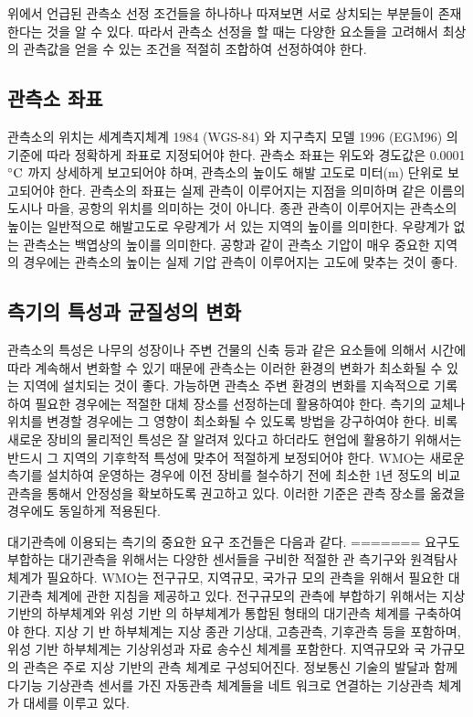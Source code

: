 \begin{itemize}
위에서 언급된 관측소 선정 조건들을 하나하나 따져보면 서로 상치되는 부분들이 존재한다는 것을 알 수 있다. 따라서 관측소 선정을 할 때는 다양한 요소들을 고려해서 최상의 관측값을 얻을 수 있는 조건을 적절히 조합하여 선정하여야 한다.

\subsection{관측소 좌표}
관측소의 위치는 세계측지체계 1984 (WGS-84) 와 지구측지 모델 1996 (EGM96) 의 기준에 따라 정확하게 좌표로 지정되어야 한다. 관측소 좌표는 위도와 경도값은 0.0001 $\rm ^{\circ}C$ 까지 상세하게 보고되어야 하며, 관측소의 높이도 해발 고도로 미터(m) 단위로 보고되어야 한다. 관측소의 좌표는 실제 관측이 이루어지는 지점을 의미하며 같은 이름의 도시나 마을, 공항의 위치를 의미하는 것이 아니다. 종관 관측이 이루어지는 관측소의 높이는 일반적으로 해발고도로 우량계가 서 있는 지역의 높이를 의미한다. 우량계가 없는 관측소는 백엽상의 높이를 의미한다. 공항과 같이 관측소 기압이 매우 중요한 지역의 경우에는 관측소의 높이는 실제 기압 관측이 이루어지는 고도에 맞추는 것이 좋다.

\subsection{측기의 특성과 균질성의 변화}
관측소의 특성은 나무의 성장이나 주변 건물의 신축 등과 같은 요소들에 의해서 시간에 따라 계속해서 변화할 수 있기 때문에 관측소는 이러한 환경의 변화가 최소화될 수 있는 지역에 설치되는 것이 좋다. 가능하면 관측소 주변 환경의 변화를 지속적으로 기록하여 필요한 경우에는 적절한 대체 장소를 선정하는데 활용하여야 한다. 측기의 교체나 위치를 변경할 경우에는 그 영향이 최소화될 수 있도록 방법을 강구하여야 한다. 비록 새로운 장비의 물리적인 특성은 잘 알려져 있다고 하더라도 현업에 활용하기 위해서는 반드시 그 지역의 기후학적 특성에 맞추어 적절하게 보정되어야 한다.
WMO는 새로운 측기를 설치하여 운영하는 경우에 이전 장비를 철수하기 전에 최소한 1년 정도의 비교 관측을 통해서 안정성을 확보하도록 권고하고 있다. 이러한 기준은 관측 장소를 옮겼을 경우에도 동일하게 적용된다.

대기관측에 이용되는 측기의 중요한 요구 조건들은 다음과 같다.
=======
요구도 부합하는 대기관측을 위해서는 다양한 센서들을 구비한 적절한 관
측기구와 원격탐사 체계가 필요하다. WMO는 전구규모, 지역규모, 국가규
모의 관측을 위해서 필요한 대기관측 체계에 관한 지침을 제공하고 있다.
전구규모의 관측에 부합하기 위해서는 지상 기반의 하부체계와 위성 기반
의 하부체계가 통합된 형태의 대기관측 체계를 구축하여야 한다. 지상 기
반 하부체계는 지상 종관 기상대, 고층관측, 기후관측 등을 포함하며, 위성
기반 하부체계는 기상위성과 자료 송수신 체계를 포함한다. 지역규모와 국
가규모의 관측은 주로 지상 기반의 관측 체계로 구성되어진다. 정보통신
기술의 발달과 함께 다기능 기상관측 센서를 가진 자동관측 체계들을 네트
워크로 연결하는 기상관측 체계가 대세를 이루고 있다.


\end{itemize}
